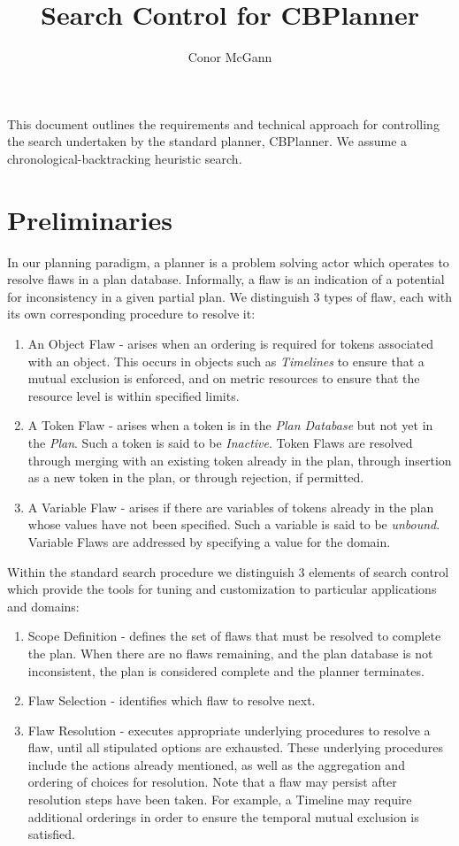 \documentclass[10pt, letterpaper, twoside]{article}
\author{Conor McGann}
\title{Search Control for CBPlanner}
\begin{document}
\maketitle

This document outlines the requirements and technical approach for controlling the search undertaken by the standard planner, CBPlanner. We assume a chronological-backtracking heuristic search.

\section{Preliminaries}

In our planning paradigm, a planner is a problem solving actor which operates to resolve flaws in a plan database. Informally, a flaw is an indication of a potential for inconsistency in a given partial plan. We distinguish 3 types of flaw, each with its own corresponding  procedure to resolve it:
\begin{enumerate}
\item An Object Flaw - arises when an ordering is required for tokens associated with an object. This occurs in objects such as {\em Timelines} to ensure that a mutual exclusion is enforced, and on metric resources to ensure that the resource level is within specified limits.
\item A Token Flaw - arises when a token is in the {\em Plan Database} but not yet in the {\em Plan}. Such a token is said to be {\em Inactive}. Token Flaws are resolved through merging with an existing token already in the plan, through insertion as a new token in the plan, or through rejection, if permitted.
\item A Variable Flaw - arises if there are variables of tokens already in the plan whose values have not been specified. Such a variable is said to be {\em unbound}. Variable Flaws are addressed by specifying a value for the domain. 
\end{enumerate}

Within the standard search procedure we distinguish 3 elements of search control which provide the tools for tuning and customization to particular applications and domains:
\begin{enumerate}
\item Scope Definition - defines the set of flaws that must be resolved to complete the plan. When there are no flaws remaining, and the plan database is not inconsistent, the plan is considered complete and the planner terminates.
\item Flaw Selection - identifies which flaw to resolve next.
\item Flaw Resolution - executes appropriate underlying procedures to resolve a flaw, until all stipulated options are exhausted. These underlying procedures include the actions already mentioned, as well as the aggregation and ordering of choices for resolution. Note that a flaw may persist after resolution steps have been taken. For example, a Timeline may require additional orderings in order to ensure the temporal mutual exclusion is satisfied.
\end{enumerate}
\end{document}
